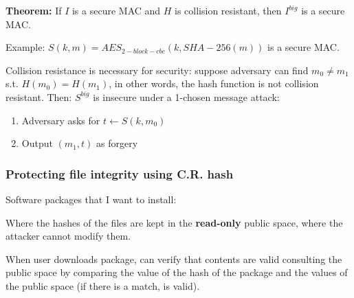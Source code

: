 \documentclass[12pt]{book}
\newcommand{\Thm}{\textbf{Theorem:} }
\begin{document}
\Thm If $I$ is a secure MAC and $H$ is collision resistant, then $I^{big}$ is a secure MAC.

Example: $S(k,m)=AES_{2-block-cbc}(k,SHA\!-\!256(m))$ is a secure MAC.

Collision resistance is necessary for security: suppose adversary can find $m_{0}\neq m_{1}$ s.t. $H(m_{0})=H(m_{1})$, in other words, the hash function is not collision resistant. Then: $S^{big}$ is insecure under a 1-chosen message attack:
\begin{enumerate}
	\item Adversary asks for $t\leftarrow S(k,m_{0})$
	\item Output $(m_{1},t)$ as forgery
\end{enumerate}

\subsubsection{Protecting file integrity using C.R. hash}
Software packages that I want to install:
\begin{center}
\end{center}Where the hashes of the files are kept in the \textbf{read-only} public space, where the attacker cannot modify them.

When user downloads package, can verify that contents are valid consulting the public space by comparing the value of the hash of the package and the values of the public space (if there is a match, is valid).
\end{document}
